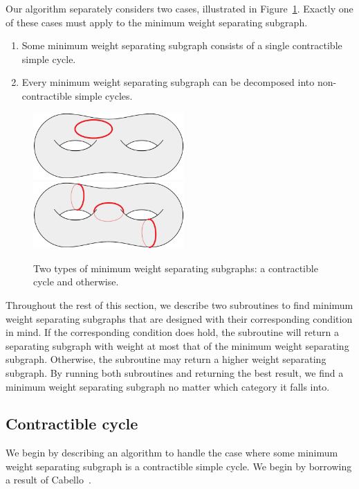 Our algorithm separately considers two cases, illustrated in Figure~\ref{fig:global_cases}. Exactly one of these cases must apply to the minimum weight separating subgraph.
\begin{enumerate}
  \item
    Some minimum weight separating subgraph consists of a single contractible simple cycle.
  \item
    Every minimum weight separating subgraph can be decomposed into non-contractible simple cycles.
\end{enumerate}
%
\begin{figure}[h]
\centering
\includegraphics[height=1in]{Fig/shortcon2}\qquad
\includegraphics[height=1in]{Fig/homologous1}
\caption{Two types of minimum weight separating subgraphs: a contractible cycle and otherwise.}
\label{fig:global_cases}
\end{figure}
%

Throughout the rest of this section, we describe two subroutines to find minimum weight separating subgraphs that are designed with their corresponding condition in mind. If the corresponding condition does hold, the subroutine will return a separating subgraph with weight at most that of the minimum weight separating subgraph. Otherwise, the subroutine may return a higher weight separating subgraph. By running both subroutines and returning the best result, we find a minimum weight separating subgraph no matter which category it falls into.


\subsection{Contractible cycle}
\label{sec:global_contractible}

We begin by describing an algorithm to handle the case where some minimum weight separating subgraph is a contractible simple cycle.
We begin by borrowing a result of Cabello~\cite[Lemma 4.1]{c-fscss-10}.

